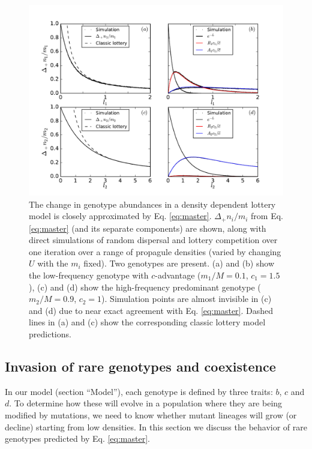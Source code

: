 \documentclass[11pt]{article}
\begin{document}
\begin{figure}
\centering
\includegraphics[scale=0.7]{simulationcomparison.pdf}
\caption{\label{fig:simcomp} The change in genotype abundances in a density dependent lottery model is closely approximated by Eq. \eqref{eq:master}. $\Delta_+ n_i/m_i$ from Eq. \eqref{eq:master} (and its separate components) are shown, along with direct simulations of random dispersal and lottery competition over one iteration over a range of propagule densities (varied by changing $U$ with the $m_i$ fixed). Two genotypes are present. (a) and (b) show the low-frequency genotype with $c$-advantage ($m_1/M=0.1$, $c_1=1.5$), (c) and (d) show the high-frequency predominant genotype ($m_2/M=0.9$, $c_2=1$). Simulation points are almost invisible in (c) and (d) due to near exact agreement with Eq. \eqref{eq:master}. Dashed lines in (a) and (c) show the corresponding classic lottery model predictions.} 
\end{figure}


\subsection*{Invasion of rare genotypes and coexistence}\label{sec:invas}

In our model (section ``Model''), each genotype is defined by three traits: $b$, $c$ and $d$. To determine how these will evolve in a population where they are being modified by mutations, we need to know whether mutant lineages will grow (or decline) starting from low densities. In this section we discuss the behavior of rare genotypes predicted by Eq. \eqref{eq:master}. 
\end{document}
